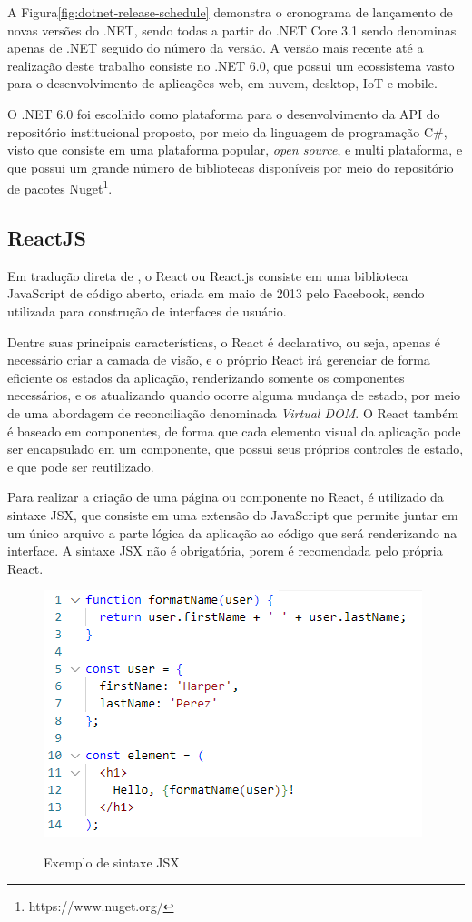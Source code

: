 A Figura\ref{fig:dotnet-release-schedule} demonstra o cronograma de lançamento
de novas versões do .NET, sendo todas a partir do .NET Core 3.1 sendo denominas
apenas de .NET seguido do número da versão. A versão mais recente até a
realização deste trabalho consiste no .NET 6.0, que possui um ecossistema
vasto para o desenvolvimento de aplicações web, em nuvem, desktop, IoT
e mobile.

O .NET 6.0 foi escolhido como plataforma para o desenvolvimento da API do
repositório institucional proposto, por meio da linguagem de programação C\#,
visto que consiste em uma plataforma popular, \emph{open source}, e multi
plataforma, e que possui um grande número de bibliotecas disponíveis
por meio do repositório de pacotes Nuget\footnote{https://www.nuget.org/}.

\subsection{ReactJS}

Em tradução direta de \citep[p. 30]{Thakkar:2020}, o React ou React.js consiste em uma
biblioteca JavaScript de código aberto, criada em maio de 2013 pelo Facebook,
sendo utilizada para construção de interfaces de usuário.

Dentre suas principais características, o React é declarativo, ou seja,
apenas é necessário criar a camada de visão, e o próprio React irá gerenciar
de forma eficiente os estados da aplicação, renderizando somente os componentes
necessários, e os atualizando quando ocorre alguma mudança de estado, por meio
de uma abordagem de reconciliação denominada \emph{Virtual DOM}. O React
também é baseado em componentes, de forma que cada elemento visual da aplicação
pode ser encapsulado em um componente, que possui seus próprios controles de estado,
e que pode ser reutilizado.

Para realizar a criação de uma página ou componente no React, é utilizado da
sintaxe JSX, que consiste em uma extensão do JavaScript que permite juntar
em um único arquivo a parte lógica da aplicação ao código que será renderizando na
interface. A sintaxe JSX não é obrigatória, porem é recomendada pelo própria React.

\begin{figure}[htb]
    \caption{Exemplo de sintaxe JSX}
    \centering
    \includegraphics[scale=1]{img/exemple-jsx.png}
    \label{fig:exemple-jsx}
\end{figure}

